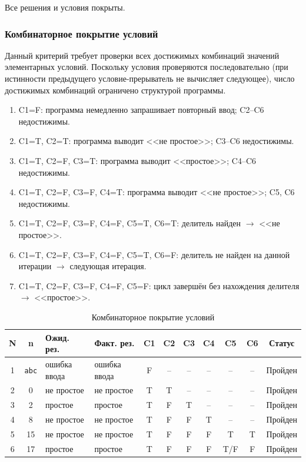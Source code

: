 \documentclass{article}[14pt]
\begin{document}
Все решения и условия покрыты.

\subsubsection{Комбинаторное покрытие условий}

Данный критерий требует проверки всех достижимых комбинаций значений элементарных условий.
Поскольку условия проверяются последовательно (при истинности предыдущего условие-прерыватель не 
вычисляет следующее), число достижимых комбинаций ограничено структурой программы.

\begin{enumerate}
    \item C1=F: программа немедленно запрашивает повторный ввод; C2--C6 недостижимы.
    \item C1=T, C2=T: программа выводит <<не простое>>; C3--C6 недостижимы.
    \item C1=T, C2=F, C3=T: программа выводит <<простое>>; C4--C6 недостижимы.
    \item C1=T, C2=F, C3=F, C4=T: программа выводит <<не простое>>; C5, C6 недостижимы.
    \item C1=T, C2=F, C3=F, C4=F, C5=T, C6=T: делитель найден $\to$ <<не простое>>.
    \item C1=T, C2=F, C3=F, C4=F, C5=T, C6=F: делитель не найден на данной итерации $\to$ следующая итерация.
    \item C1=T, C2=F, C3=F, C4=F, C5=F: цикл завершён без нахождения делителя $\to$ <<простое>>.
\end{enumerate}

\begin{table}[H]
\centering
\caption{Комбинаторное покрытие условий}
\begin{tabularx}{\textwidth}{|c|c|X|X|c|c|c|c|c|c|c|}
\hline
\textbf{N} & \textbf{n} & \textbf{Ожид. рез.} & \textbf{Факт. рез.} & \textbf{C1} & \textbf{C2} & \textbf{C3} & \textbf{C4} & \textbf{C5} & \textbf{C6} & \textbf{Статус} \\
\hline
1 & \texttt{abc} & ошибка ввода & ошибка ввода & F & -- & -- & -- & -- & -- & Пройден \\
\hline
2 & 0 & не простое & не простое & T & T & -- & -- & -- & -- & Пройден \\
\hline
3 & 2 & простое & простое & T & F & T & -- & -- & -- & Пройден \\
\hline
4 & 8 & не простое & не простое & T & F & F & T & -- & -- & Пройден \\
\hline
5 & 15 & не простое & не простое & T & F & F & F & T & T & Пройден \\
\hline
6 & 17 & простое & простое & T & F & F & F & T/F & F & Пройден \\
\hline
\end{tabularx}
\end{table}
\end{document}
